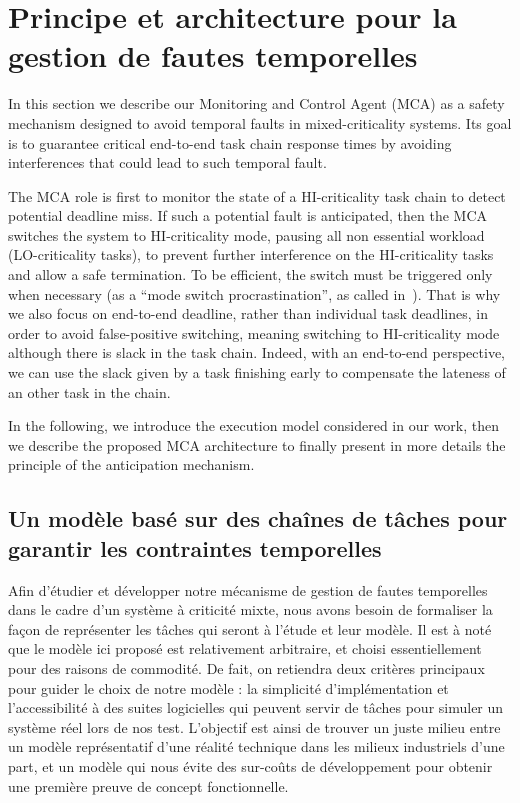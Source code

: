 \documentclass[french, a4paper, 11pt, twoside, pdftex]{StyleThese}
\begin{document}
\setcounter{chapter}{3} %
\dominitoc
\faketableofcontents
\fi

\chapter{Principe et architecture pour la gestion de fautes temporelles}
\minitoc

In this section we describe our Monitoring and Control Agent (MCA) as a safety mechanism designed to avoid temporal faults in mixed-criticality systems. Its goal is to guarantee critical end-to-end task chain response times by avoiding interferences that could lead to such temporal fault.

The MCA role is first to monitor the state of a HI-criticality task chain to detect potential deadline miss. If such a potential fault is anticipated, then the MCA switches the system to HI-criticality mode, pausing all non essential workload (LO-criticality tasks), to prevent further interference on the HI-criticality tasks and allow a safe termination. To be efficient, the switch  must be triggered only when necessary (as a “mode switch procrastination”, as called in~\cite{hu_ffob_2019}). That is why we also focus on end-to-end deadline, rather than individual task deadlines, in order to avoid false-positive switching, meaning switching to HI-criticality mode although there is slack in the task chain. Indeed, with an end-to-end perspective, we can use the slack given by a task finishing early to compensate the lateness of an other task in the chain.

In the following, we introduce the execution model considered in our work, then we describe the proposed MCA architecture to finally present in more details the principle of the anticipation mechanism.

\section{Un modèle basé sur des chaînes de tâches pour garantir les contraintes temporelles}

    
    Afin d'étudier et développer notre mécanisme de gestion de fautes temporelles dans le cadre d'un système à criticité mixte, nous avons besoin de formaliser la façon de représenter les tâches qui seront à l'étude et leur modèle. Il est à noté que le modèle ici proposé est relativement arbitraire, et choisi essentiellement pour des raisons de commodité. De fait, on retiendra deux critères principaux pour guider le choix de notre modèle : la simplicité d'implémentation et l'accessibilité à des suites logicielles qui peuvent servir de tâches pour simuler un système réel lors de nos test. L'objectif est ainsi de trouver un juste milieu entre un modèle représentatif d'une réalité technique dans les milieux industriels d'une part, et un modèle qui nous évite des sur-coûts de développement pour obtenir une première preuve de concept fonctionnelle.
    
\end{document}
